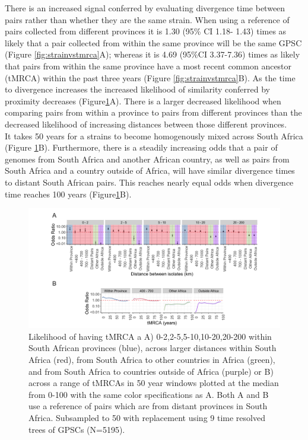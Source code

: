\documentclass{article}
\begin{document}
There is an increased signal conferred by evaluating divergence time between pairs rather than whether they are the same strain. When using a reference of pairs collected from different provinces it is 1.30 (95\% CI 1.18- 1.43) times as likely that a pair collected from within the same province will be the same GPSC (Figure \ref{fig:strainvstmrca}A); whereas it is 4.69 (95\%CI 3.37-7.36) times as likely that pairs from within the same province have a most recent common ancestor (tMRCA) within the past three years (Figure \ref{fig:strainvstmrca}B). As the time to divergence increases the increased likelihood of similarity conferred by proximity decreases (Figure\ref{fig:timedistance}A). There is a larger decreased likelihood when comparing pairs from within a province to pairs from different provinces than the decreased likelihood of increasing distances between those different provinces. \\It takes 50 years for a strains to become homogenously mixed across South Africa (Figure \ref{fig:timedistance}B). Furthermore, there is  a steadily increasing odds that a pair of genomes from South Africa and another African country, as well as pairs from South Africa and a country outside of Africa, will have similar divergence times to distant South African pairs. This reaches nearly equal odds when divergence time reaches 100 years (Figure\ref{fig:timedistance}B). 
\begin{figure}[H]
\centering
    \includegraphics[width=\textwidth]{timeanddistance.png}
    \caption{Likelihood of having tMRCA a A) 0-2,2-5,5-10,10-20,20-200 within South African provinces (blue), across larger distances within South Africa (red), from South Africa to other countries in Africa (green), and from South Africa to countries outside of Africa (purple) or B) across a range of tMRCAs in 50 year windows plotted at the median from 0-100 with the same color specifications as A. Both A and B use a reference of pairs which are from distant provinces in South Africa. Subsampled to 50 with replacement using 9 time resolved trees of GPSCs (N=5195).}
      \label{fig:timedistance}
\end{figure}
\end{document}
